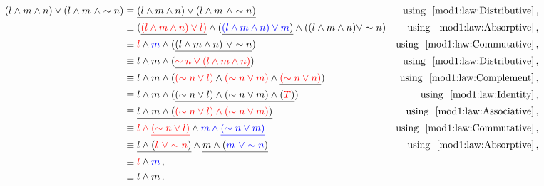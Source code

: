 \begin{subquestions}
\begin{align*}
	\hspace{-10mm}
	(l \land m \land n) \lor (l \land m ~\land \sim n) & \equiv \underline{(l \land m \land n) \lor (l \land m ~\land \sim n)}
	& \text{using ~\ref{mod1:law:Distributive}}\,, \nn \\ 
	 												  & \equiv (\underline{\textcolor{red}{(l \land m \land n) \lor l)}} \land (\underline{\textcolor{blue}{(l \land m \land n) \lor m})} \land ((l \land m    \land n) \lor \sim n)
    & \text{using ~\ref{mod1:law:Absorptive}}\,, \nn \\ 
													  & \equiv \textcolor{red}{l} \land \textcolor{blue}{m} \land (\underline{(l \land m \land n) ~\lor \sim n})
	& \text{using ~\ref{mod1:law:Commutative}}\,, \nn \\ 
													  & \equiv l \land m \land (\underline{\textcolor{red}{\sim n \lor (l \land m \land n)}})
  	& \text{using ~\ref{mod1:law:Distributive}}\,, \nn \\
  													  & \equiv l \land m \land (\textcolor{red}{(\sim n \lor l)} \land \textcolor{red}{(\sim n \lor m)} \land \underline{\textcolor{red}{(\sim n \lor n)}})
    & \text{using ~\ref{mod1:law:Complement}}\,, \nn \\
    										    	  & \equiv l \land m \land (\underline{(\sim n \lor l) \land (\sim n \lor m) \land (\textcolor{red}{T})})
    & \text{using ~\ref{mod1:law:Identity}}\,, \nn \\    
    										    	  & \equiv \underline{l \land m \land (\textcolor{red}{(\sim n \lor l) \land (\sim n \lor m)})}
    & \text{using ~\ref{mod1:law:Associative}}\,, \nn \\  
    												  & \equiv \textcolor{red}{l \land \underline{(\sim n \lor l)}} \land \textcolor{blue}{m \land \underline{(\sim n \lor m)}}
    & \text{using ~\ref{mod1:law:Commutative}}\,, \nn \\     
    				    	    					  & \equiv \underline{l \land (\textcolor{red}{l ~\lor \sim n})} \land \underline{m \land (\textcolor{blue}{m ~\lor \sim n})}
    & \text{using ~\ref{mod1:law:Absorptive}}\,, \nn \\ 	
    												  & \equiv \textcolor{red}{l} \land \textcolor{blue}{m}\,, \\	
													  & \equiv l \land m\,. \\							  			    	    					  				 											
\end{align*}



\end{subquestions}
